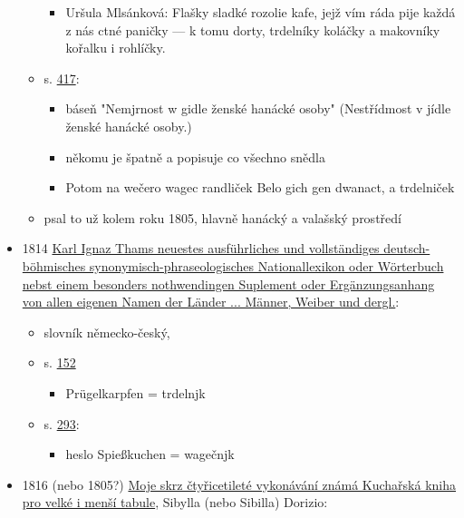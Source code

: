 \begin{itemize}
\begin{itemize}
    \begin{itemize}
    \tightlist
    \item
      Uršula Mlsánková: Flašky sladké rozolie kafe, jejž vím ráda pije
      každá z nás ctné paničky --- k tomu dorty, trdelníky koláčky a
      makovníky kořalku i rohlíčky.
    \end{itemize}
  \item
    s.
    \href{https://ndk.cz/view/uuid:c0247bb0-d3b5-11dc-b9b7-000d606f5dc6?page=uuid\%3Ada5b6cb7-cfb0-4ebd-b6be-84d59f5e6f72}{417}:

    \begin{itemize}
    \tightlist
    \item
      báseň "Nemjrnost w gidle ženské hanácké osoby" (Nestřídmost v
      jídle ženské hanácké osoby.)
    \item
      někomu je špatně a popisuje co všechno snědla
    \item
      Potom na wečero wagec randliček Belo gich gen dwanact, a
      trdelniček
    \end{itemize}
  \item
    psal to už kolem roku 1805, hlavně hanácký a valašský prostředí
  \end{itemize}
\item
  1814
  \href{https://ndk.cz/uuid/uuid:4672a240-c28c-11dc-9931-000d606f5dc6}{Karl
  Ignaz Thams neuestes ausführliches und vollständiges
  deutsch-böhmisches synonymisch-phraseologisches Nationallexikon oder
  Wörterbuch nebst einem besonders nothwendingen Suplement oder
  Ergänzungsanhang von allen eigenen Namen der Länder ... Männer, Weiber
  und dergl.}:

  \begin{itemize}
  \tightlist
  \item
    slovník německo-český,
  \item
    s.
    \href{https://ndk.cz/uuid/uuid:4672a240-c28c-11dc-9931-000d606f5dc6}{152}

    \begin{itemize}
    \tightlist
    \item
      Prügelkarpfen = trdelnjk
    \end{itemize}
  \item
    s.
    \href{https://ceskadigitalniknihovna.cz/uuid/uuid:9b4f95a7-eb8b-4008-8023-15cc5563f0ed}{293}:

    \begin{itemize}
    \tightlist
    \item
      heslo Spießkuchen = wagečnjk
    \end{itemize}
  \end{itemize}
\item
  1816 (nebo 1805?)
  \href{https://books.google.cz/books?id=7SZjAAAAcAAJ&hl=cs&pg=PA227\#v=onepage&q&f=false}{Moje
  skrz čtyřicetileté vykonávání známá Kuchařská kniha pro velké i menší
  tabule}, Sibylla (nebo Sibilla) Dorizio:


\end{itemize}
